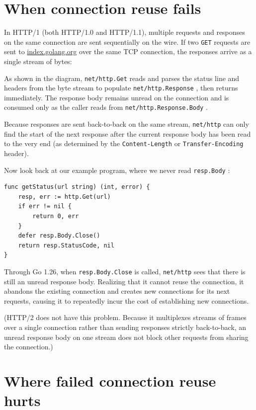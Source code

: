 \documentclass[11pt,a4paper]{article}
\begin{document}
\section{When connection reuse fails}

In HTTP/1 (both HTTP/1.0 and HTTP/1.1), multiple requests and responses on the same connection are sent sequentially on the wire. If two \texttt{GET} requests are sent to \href{https://index.golang.org/}{index.golang.org} over the same TCP connection, the responses arrive as a single stream of bytes:

\begin{figure}[h]
\end{figure}

As shown in the diagram, \texttt{net/http.Get} reads and parses the status line and headers from the byte stream to populate \texttt{net/http.Response} , then returns immediately. The response body remains unread on the connection and is consumed only as the caller reads from \texttt{net/http.Response.Body} .

Because responses are sent back-to-back on the same stream, \texttt{net/http} can only find the start of the next response after the current response body has been read to the very end (as determined by the \texttt{Content-Length} or \texttt{Transfer-Encoding} header).

Now look back at our example program, where we never read \texttt{resp.Body} :

\begin{verbatim}
func getStatus(url string) (int, error) {
    resp, err := http.Get(url)
    if err != nil {
        return 0, err
    }
    defer resp.Body.Close()
    return resp.StatusCode, nil
}
\end{verbatim}

Through Go 1.26, when \texttt{resp.Body.Close} is called, \texttt{net/http} sees that there is still an unread response body. Realizing that it cannot reuse the connection, it abandons the existing connection and creates new connections for its next requests, causing it to repeatedly incur the cost of establishing new connections.

(HTTP/2 does not have this problem. Because it multiplexes streams of frames over a single connection rather than sending responses strictly back-to-back, an unread response body on one stream does not block other requests from sharing the connection.)

\section{Where failed connection reuse hurts}
\end{document}
